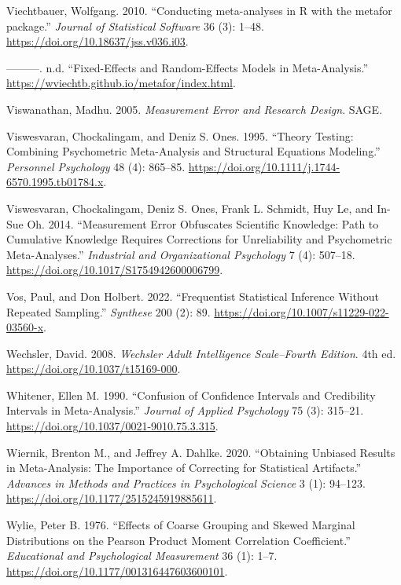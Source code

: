 \documentclass[
  letterpaper,
  DIV=11,
  numbers=noendperiod]{scrreprt}
\newlength{\cslhangindent}
\newlength{\cslentryspacingunit} %
\newenvironment{CSLReferences}[2] %
 {%
  \setlength{\parindent}{0pt}
  \ifodd #1
  \let\oldpar\par
  \def\par{\hangindent=\cslhangindent\oldpar}
  \fi
  \setlength{\parskip}{#2\cslentryspacingunit}
 }%
 {}
\begin{document}
\begin{CSLReferences}{1}{0}
\leavevmode{}%
Viechtbauer, Wolfgang. 2010. {``Conducting meta-analyses in R with the
metafor package.''} \emph{Journal of Statistical Software} 36 (3):
1--48. \url{https://doi.org/10.18637/jss.v036.i03}.

\leavevmode{}%
---------. n.d. {``Fixed-Effects and Random-Effects Models in
Meta-Analysis.''} \url{https://wviechtb.github.io/metafor/index.html}.

\leavevmode{}%
Viswanathan, Madhu. 2005. \emph{Measurement Error and Research Design}.
SAGE.

\leavevmode{}%
Viswesvaran, Chockalingam, and Deniz S. Ones. 1995. {``Theory Testing:
Combining Psychometric Meta-Analysis and Structural Equations
Modeling.''} \emph{Personnel Psychology} 48 (4): 865--85.
\url{https://doi.org/10.1111/j.1744-6570.1995.tb01784.x}.

\leavevmode{}%
Viswesvaran, Chockalingam, Deniz S. Ones, Frank L. Schmidt, Huy Le, and
In-Sue Oh. 2014. {``Measurement Error Obfuscates Scientific Knowledge:
Path to Cumulative Knowledge Requires Corrections for Unreliability and
Psychometric Meta-Analyses.''} \emph{Industrial and Organizational
Psychology} 7 (4): 507--18.
\url{https://doi.org/10.1017/S1754942600006799}.

\leavevmode{}%
Vos, Paul, and Don Holbert. 2022. {``Frequentist Statistical Inference
Without Repeated Sampling.''} \emph{Synthese} 200 (2): 89.
\url{https://doi.org/10.1007/s11229-022-03560-x}.

\leavevmode{}%
Wechsler, David. 2008. \emph{Wechsler Adult Intelligence Scale--Fourth
Edition}. 4th ed. \url{https://doi.org/10.1037/t15169-000}.

\leavevmode{}%
Whitener, Ellen M. 1990. {``Confusion of Confidence Intervals and
Credibility Intervals in Meta-Analysis.''} \emph{Journal of Applied
Psychology} 75 (3): 315--21.
\url{https://doi.org/10.1037/0021-9010.75.3.315}.

\leavevmode{}%
Wiernik, Brenton M., and Jeffrey A. Dahlke. 2020. {``Obtaining Unbiased
Results in Meta-Analysis: The Importance of Correcting for Statistical
Artifacts.''} \emph{Advances in Methods and Practices in Psychological
Science} 3 (1): 94--123. \url{https://doi.org/10.1177/2515245919885611}.

\leavevmode{}%
Wylie, Peter B. 1976. {``Effects of Coarse Grouping and Skewed Marginal
Distributions on the Pearson Product Moment Correlation Coefficient.''}
\emph{Educational and Psychological Measurement} 36 (1): 1--7.
\url{https://doi.org/10.1177/001316447603600101}.

\end{CSLReferences}
\end{document}
